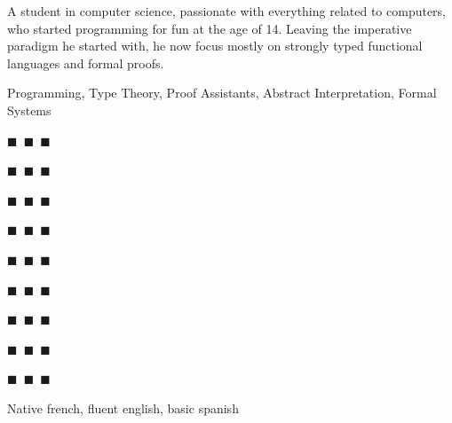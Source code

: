 \documentclass[a4paper,11pt]{extarticle}
\newcommand{\skdabb} {\colorbox{ForestGreen!80!white}{\color{skcol}$\blacksquare$~\color{noskcol}$\blacksquare$~\color{noskcol}$\blacksquare$}}
\newcommand{\skmore} {\colorbox{ForestGreen!80!white}{\color{skcol}$\blacksquare$~\color{skcol}$\blacksquare$~\color{noskcol}$\blacksquare$}}
\newcommand{\skexp}  {\colorbox{ForestGreen!80!white}{\color{skcol}$\blacksquare$~\color{skcol}$\blacksquare$~\color{skcol}$\blacksquare$}}
\begin{document}
\begin{minipage}[c]{0.35\linewidth}
\begin{tcolorbox}
        \vspace{0.3cm}

        A student in computer science, passionate with everything related to
        computers, who started programming for fun at the age of 14. Leaving
        the imperative paradigm he started with, he now focus mostly on
        strongly typed functional languages and formal proofs.

        \vspace{0.3cm}

        Programming, Type Theory, Proof Assistants,
        Abstract Interpretation, Formal Systems


        \vspace{0.3cm}
        \begin{description}\setlength{\itemsep}{0em}
          \item[C++]\hfill\skexp
          \item[Haskell]\hfill\skexp
          \item[\LaTeX]\hfill\skexp
          \item[Linux]\hfill\skexp
          \item[Coq]\hfill\skmore
          \item[Prolog]\hfill\skmore
          \item[Nix]\hfill\skmore
          \item[OCaml]\hfill\skdabb
          \item[Python]\hfill\skdabb
        \end{description}

        \vspace{0cm}

        Native french, fluent english, basic spanish


    \end{tcolorbox}\end{minipage}
    \hfill
\end{document}
